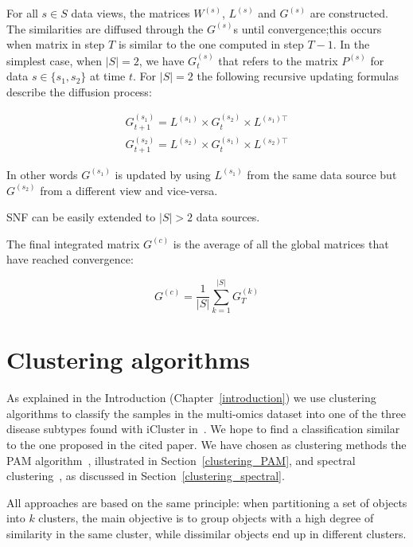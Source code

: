 For all $s\in S$ data views, the matrices $W^{(s)}$, $L^{(s)}$ and $G^{(s)}$ are constructed. The similarities are diffused through the $G^{(s)}$s until convergence;this occurs when matrix in step $T$ is similar to the one computed in step $T-1$.  
In the simplest case, when $|S|=2$, we have $G_t^{(s)}$ that refers to the matrix $P^{(s)}$ for data $s \in \{ s_1,s_2\}$ at time $t$.
For $|S|=2$ the following recursive updating formulas describe the diffusion process:

\begin{equation*}
    \begin{gathered}
        G^{(s_1)}_{t+1}=L^{(s_1)} \times G^{(s_2)}_{t} \times L^{(s_1)\top} \\
        G^{(s_2)}_{t+1}=L^{(s_2)} \times G^{(s_1)}_{t} \times L^{(s_2)\top}  
    \end{gathered}
\end{equation*}

In other words $G^{(s_1)}$ is updated by using $L^{(s_1)}$ from the same data source but $G^{(s_2)}$ from a different view and vice-versa.

SNF can be easily extended to $|S|>2$ data sources. \newline


The final integrated matrix $G^{(c)}$ is the average of all the global matrices that have reached convergence:

\begin{equation*}
    G^{(c)} = \frac{1}{|S|} \sum_{k=1}^{|S|} G_T^{(k)}
\end{equation*}


\section{Clustering algorithms}\label{methods_clustering}
As explained in the Introduction (Chapter~\ref{introduction}) we use clustering algorithms to classify the samples in the multi-omics dataset into one of the three disease subtypes found with iCluster in~\cite{shen2009integrative}. We hope to find a classification similar to the one proposed in the cited paper. We have chosen as clustering methods the PAM algorithm~\cite{PAM}, illustrated in Section~\ref{clustering_PAM}, and spectral clustering~\cite{von2007SP}, as discussed in Section~\ref{clustering_spectral}.

All approaches are based on the same principle: when partitioning a set of objects into $k$ clusters, the main objective is to group objects with a high degree of similarity in the same cluster, while dissimilar objects end up in different clusters.

